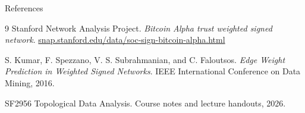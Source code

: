 \documentclass[aspectratio=169,11pt]{beamer}
\begin{document}
\begin{frame}[noframenumbering]{References}
  \small
  \begin{thebibliography}{9}
      Stanford Network Analysis Project.
      \newblock \emph{Bitcoin Alpha trust weighted signed network}.
      \newblock \href{https://snap.stanford.edu/data/soc-sign-bitcoin-alpha.html}{snap.stanford.edu/data/soc-sign-bitcoin-alpha.html}

      S. Kumar, F. Spezzano, V. S. Subrahmanian, and C. Faloutsos.
      \newblock \emph{Edge Weight Prediction in Weighted Signed Networks}.
      \newblock IEEE International Conference on Data Mining, 2016.

      SF2956 Topological Data Analysis.
      \newblock Course notes and lecture handouts, 2026.
  \end{thebibliography}
\end{frame}
\end{document}

